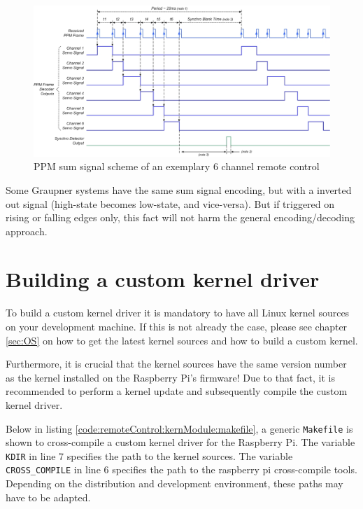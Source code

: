 \begin{figure}[H]
    \centering
    \includegraphics[width=\textwidth]{fig/ch-ppm-kernel-driver/graupnerPPM}
    \caption[PPM sum signal scheme \cite{doc:REP}]{PPM sum signal scheme of an exemplary 6 channel remote control \cite{doc:REP}}
    \label{fig:remoteControl:ppmNutshell:ppmSumSignal}
\end{figure}

Some Graupner systems have the same sum signal encoding, but with a inverted out signal (high-state becomes low-state, and vice-versa). But if triggered on rising or falling edges only, this fact will not harm the general encoding/decoding approach.

\section{Building a custom kernel driver}
\label{sec:remoteControl:kernModule}

To build a custom kernel driver it is mandatory to have all Linux kernel sources on your development machine. If this is not already the case, please see chapter \ref{sec:OS} on how to get the latest kernel sources and how to build a custom kernel.

Furthermore, it is crucial that the kernel sources have the same version number as the kernel installed on the Raspberry Pi's firmware! Due to that fact, it is recommended to perform a kernel update and subsequently compile the custom kernel driver.

Below in listing \ref{code:remoteControl:kernModule:makefile}, a generic \texttt{Makefile} is shown to cross-compile a custom kernel driver for the Raspberry Pi. The variable \texttt{KDIR} in line 7 specifies the path to the kernel sources. The variable \texttt{CROSS\_COMPILE} in line 6 specifies the path to the raspberry pi cross-compile tools. Depending on the distribution and development environment, these paths may have to be adapted.


